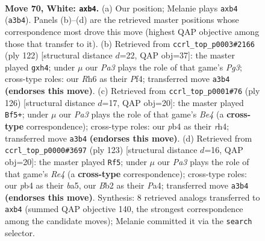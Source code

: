 \documentclass[11pt]{article}
\begin{document}
\clearpage

\begin{figure}[p]\centering
\begin{subfigure}{0.46\textwidth}\centering
\resizebox{\linewidth}{!}{%
\newchessgame
\chessboard[
  setfen={8/4k3/7R/8/bpp5/P7/1B4r1/2K5 w - - 0 70},
  showmover=false,
  pgfstyle=straightmove, color=movearrow, markmove={a3-b4}
]}
\caption{}
\end{subfigure}\hfill
\begin{subfigure}{0.46\textwidth}\centering
\resizebox{\linewidth}{!}{%
\newchessgame
\chessboard[
  setfen={8/8/4b2k/8/4BP1p/6P1/6K1/8 w - - 0 62},
  showmover=false,
  pgfstyle=straightmove, color=movearrow, markmove={g3-h4}
]}
\caption{}
\end{subfigure}
\\[4pt]
\begin{subfigure}{0.46\textwidth}\centering
\resizebox{\linewidth}{!}{%
\newchessgame
\chessboard[
  setfen={8/7P/4k3/1R6/4B2r/2b2K2/8/8 w - - 7 64},
  showmover=false,
  pgfstyle=straightmove, color=movearrow, markmove={e4-f5}
]}
\caption{}
\end{subfigure}\hfill
\begin{subfigure}{0.46\textwidth}\centering
\resizebox{\linewidth}{!}{%
\newchessgame
\chessboard[
  setfen={8/5k2/K7/B3r3/p2R4/Pb6/8/8 b - - 5 62},
  showmover=false,
  pgfstyle=straightmove, color=movearrow, markmove={e5-f5}
]}
\caption{}
\end{subfigure}
\caption{\textbf{Move 70, White: \texttt{axb4}.} (a) Our position; Melanie plays \texttt{axb4} (\texttt{a3b4}). Panels (b)--(d) are the retrieved master positions whose correspondence most drove this move (highest QAP objective among those that transfer to it). (b) Retrieved from \texttt{ccrl\_top\_p0003\#2166} (ply 122) [structural distance $d$=22, QAP obj=37]: the master played \texttt{gxh4}; under $\mu$ our \emph{Pa3} plays the role of that game's \emph{Pg3}; cross-type roles: our \emph{R}h6 as their \emph{P}f4; transferred move \texttt{a3b4} \textbf{(endorses this move)}. (c) Retrieved from \texttt{ccrl\_top\_p0001\#76} (ply 126) [structural distance $d$=17, QAP obj=20]: the master played \texttt{Bf5+}; under $\mu$ our \emph{Pa3} plays the role of that game's \emph{Be4} (a \textbf{cross-type} correspondence); cross-type roles: our \emph{p}b4 as their \emph{r}h4; transferred move \texttt{a3b4} \textbf{(endorses this move)}. (d) Retrieved from \texttt{ccrl\_top\_p0000\#3697} (ply 123) [structural distance $d$=16, QAP obj=20]: the master played \texttt{Rf5}; under $\mu$ our \emph{Pa3} plays the role of that game's \emph{Re4} (a \textbf{cross-type} correspondence); cross-type roles: our \emph{p}b4 as their \emph{b}a5, our \emph{B}b2 as their \emph{P}a4; transferred move \texttt{a3b4} \textbf{(endorses this move)}. Synthesis: 8 retrieved analogs transferred to \texttt{axb4} (summed QAP objective 140, the strongest correspondence among the candidate moves); Melanie committed it via the \texttt{search} selector.}
\label{fig:thought-m138}
\end{figure}
\end{document}
